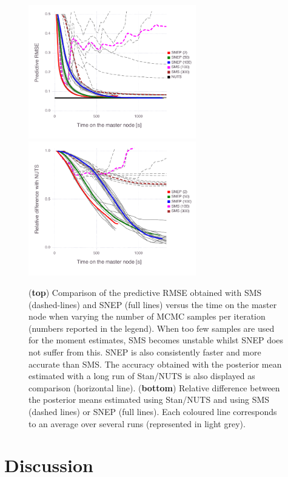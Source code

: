 \begin{figure}[!h]
	\center
	\includegraphics[width=0.65\textwidth]{figures/snep/SMSvSNEP_RMSE}
	\includegraphics[width=0.65\textwidth]{figures/snep/SMSvSNEP_DIFF.pdf}
	\caption{\label{fig:sms-vs-snep}(\textbf{top}) Comparison of the predictive RMSE obtained with SMS (dashed-lines) and SNEP (full lines) versus the time on the master node when varying the number of MCMC samples per iteration (numbers reported in the legend). When too few samples are used for the moment estimates, SMS becomes unstable whilst SNEP does not suffer from this. SNEP is also consistently faster and more accurate than SMS. The accuracy obtained with the posterior mean estimated with a long run of Stan/NUTS is also displayed as comparison (horizontal line). (\textbf{bottom}) Relative difference between the posterior means estimated using Stan/NUTS and using SMS (dashed lines) or SNEP (full lines). Each coloured line corresponds to an average over several runs (represented in light grey).}
\end{figure}

\section{Discussion}

